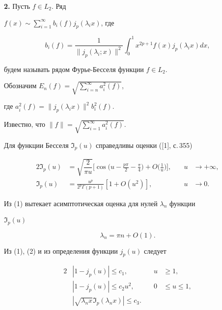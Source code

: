 \medskip 


 


{\bf 2.} Пусть $f\in L_2$. Ряд 


$f(x)\sim\sum\limits^\infty_{i=1}b_i(f)j_p(\lambda_i x)$, где 


$$ 


b_i(f)=\frac{1}{\|j_p(\lambda_i;x)\|^2}\int^1_0 


x^{2p+1}f(x)j_p(\lambda_i x)dx, 


$$ 


будем называть рядом Фурье-Бесселя функции $f\in L_2$. 


 


Обозначим $E_n(f)=\sqrt{\sum\limits^\infty_{i=n}a^2_i(f)}$, 


где $a^2_i(f)=\|j_p(\lambda_i x)\|^2 b^2_i(f)$. 


Известно, что $\|f\|=\sqrt{\sum\limits^\infty_{i=1}a^2_i(f)}$.


 


Для функции Бесселя $\Im_p(u)$ справедливы оценки ([1], с.\,355) 


\begin{alignat}{2} 


\Im_p(u)&=\sqrt{\dfrac{2}{\pi u}}\bigg[\cos\bigg (


u-\frac{p\pi}{2}-\frac{\pi}{4}\bigg)+O\bigg(\frac{1}{u} 


\bigg)\bigg], &\quad u&\to +\infty,\\ 


\Im_p(u)&=\frac{u^p}{2^p\Gamma(p+1)}[1+O(u^2)], &\quad u&\to 0. 


\end{alignat} 


Из (1) вытекает асимптотическая оценка для нулей $\lambda_n$ функции 


$\Im_p(u)$ 


\begin{equation} 


\lambda_n=\pi n+O(1). 


\end{equation} 


Из (1), (2) и из определения функции $j_p(u)$ следует


\begin{alignat}{2} 


&|1-j_p(u)|\le c_1, &\quad u&\ge1,\\ 


&|1-j_p(u)|\le c_2u^2, &\quad 0&\le u\le 1, \\ 


&|\sqrt{\lambda_n x}\Im_p(\lambda_n x)|\le c_3. &\quad &\ 


\end{alignat} 


